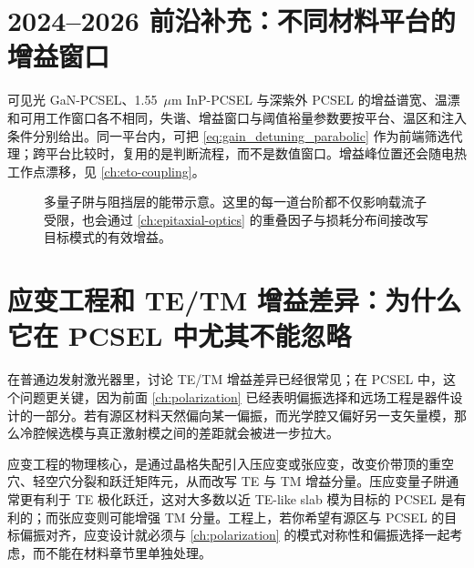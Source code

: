 \section{2024--2026 前沿补充：不同材料平台的增益窗口}
可见光 GaN-PCSEL、1.55~$\mu$m InP-PCSEL 与深紫外 PCSEL 的增益谱宽、温漂和可用工作窗口各不相同\cite{taguchi2024greenpcsel,aoki2024stable1550pcsel,lu2025deepuvpcsel}，失谐、增益窗口与阈值裕量参数要按平台、温区和注入条件分别给出。同一平台内，可把 \cref{eq:gain_detuning_parabolic} 作为前端筛选代理；跨平台比较时，复用的是判断流程，而不是数值窗口。增益峰位置还会随电热工作点漂移，见 \cref{ch:eto-coupling}。

\begin{figure}[htbp]
  \centering
  \caption{多量子阱与阻挡层的能带示意。这里的每一道台阶都不仅影响载流子受限，也会通过 \cref{ch:epitaxial-optics} 的重叠因子与损耗分布间接改写目标模式的有效增益。}
  \label{fig:mqw_barrier_blocking}
\end{figure}

\section{应变工程和 TE/TM 增益差异：为什么它在 PCSEL 中尤其不能忽略}

在普通边发射激光器里，讨论 TE/TM 增益差异已经很常见；在 PCSEL 中，这个问题更关键，因为前面 \cref{ch:polarization} 已经表明偏振选择和远场工程是器件设计的一部分。若有源区材料天然偏向某一偏振，而光学腔又偏好另一支矢量模，那么冷腔候选模与真正激射模之间的差距就会被进一步拉大。

应变工程的物理核心，是通过晶格失配引入压应变或张应变，改变价带顶的重空穴、轻空穴分裂和跃迁矩阵元，从而改写 TE 与 TM 增益分量。压应变量子阱通常更有利于 TE 极化跃迁，这对大多数以近 TE-like slab 模为目标的 PCSEL 是有利的；而张应变则可能增强 TM 分量。工程上，若你希望有源区与 PCSEL 的目标偏振对齐，应变设计就必须与 \cref{ch:polarization} 的模式对称性和偏振选择一起考虑，而不能在材料章节里单独处理。

